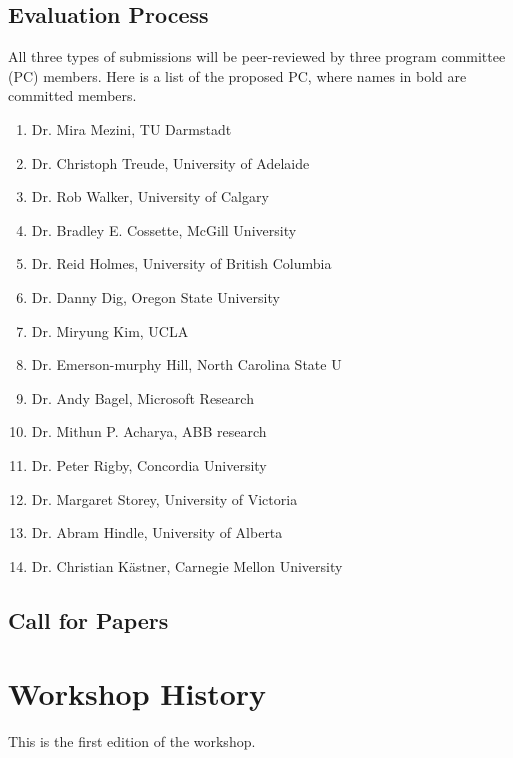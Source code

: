 \documentclass[10pt, conference]{IEEEtran}
\begin{document}
\subsection{Evaluation Process}
All three types of submissions will be peer-reviewed by three program committee (PC) members. Here is a list of the proposed PC, where names in bold are committed members.

\begin{enumerate}
\item Dr. Mira Mezini, TU Darmstadt
\item Dr. Christoph Treude, University of Adelaide 
\item Dr. Rob Walker, University of Calgary
\item Dr. Bradley E. Cossette, McGill University
\item Dr. Reid Holmes, University of British Columbia
\item Dr. Danny Dig, Oregon State University
\item Dr. Miryung Kim, UCLA
\item Dr. Emerson-murphy Hill, North Carolina State U
\item Dr. Andy Bagel, Microsoft Research
\item Dr. Mithun P. Acharya, ABB research
\item Dr. Peter Rigby, Concordia University
\item Dr. Margaret Storey, University of Victoria
\item Dr. Abram Hindle, University of Alberta
\item Dr. Christian K\"{a}stner, Carnegie Mellon University
\end{enumerate}

\subsection{Call for Papers}

\section{Workshop History}

This is the first edition of the workshop.
\end{document}
